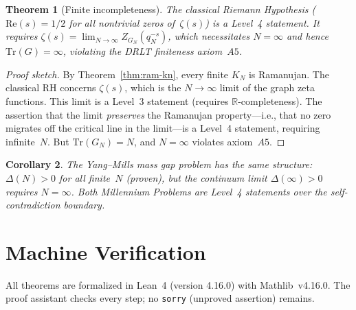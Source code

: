 \documentclass[12pt]{article}
\newtheorem{theorem}{Theorem}[section]
\newtheorem{corollary}[theorem]{Corollary}
\theoremstyle{definition}
\theoremstyle{remark}
\newcommand{\RR}{\mathbb{R}}
\newcommand{\Tr}{\mathrm{Tr}}
\begin{document}
\begin{theorem}[Finite incompleteness]\label{thm:wall}
The classical Riemann Hypothesis ($\mathrm{Re}(s) = 1/2$
for all nontrivial zeros of~$\zeta(s)$) is a Level~4 statement.
It requires $\zeta(s) = \lim_{N \to \infty} Z_{G_N}(q_N^{-s})$,
which necessitates $N = \infty$ and hence $\Tr(G) = \infty$,
violating the DRLT finiteness axiom~$A5$.
\end{theorem}

\begin{proof}[Proof sketch]
By Theorem~\ref{thm:ram-kn}, every finite $K_N$ is Ramanujan.
The classical RH concerns $\zeta(s)$, which is the
$N \to \infty$ limit of the graph zeta functions.
This limit is a Level~3 statement (requires $\RR$-completeness).
The assertion that the limit \emph{preserves} the Ramanujan
property---i.e., that no zero migrates off the critical line
in the limit---is a Level~4 statement, requiring infinite~$N$.
But $\Tr(G_N) = N$, and $N = \infty$ violates axiom~$A5$.
\end{proof}

\begin{corollary}
The Yang--Mills mass gap problem has the same structure:
$\Delta(N) > 0$ for all finite~$N$ (proven), but the
continuum limit $\Delta(\infty) > 0$ requires $N = \infty$.
Both Millennium Problems are Level~4 statements over the
self-contradiction boundary.
\end{corollary}

\section{Machine Verification}
\label{sec:lean}

All theorems are formalized in Lean~4 (version 4.16.0)
with Mathlib~v4.16.0.
The proof assistant checks every step; no \texttt{sorry}
(unproved assertion) remains.
\end{document}
